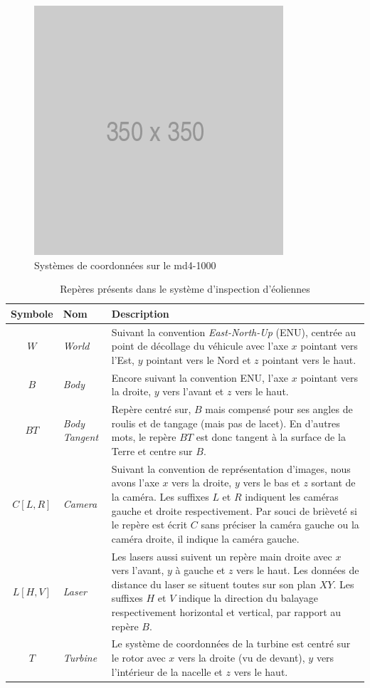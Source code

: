 \begin{figure}[htp]
  \centering
  \includegraphics[width=0.5\linewidth]{images/placeholder.png}
  \caption{Systèmes de coordonnées sur le md4-1000}
  \label{fig:md41000}
\end{figure}

\begin{table}[htp]
  \centering
  \setlength{\tabcolsep}{12pt}
  \begin{tabular}[htp]{|c|l|p{10cm}|}
    \hline
    Symbole & Nom                   & Description\\\hline
    $W$     &  \textit{World}       & Suivant la convention \textit{East-North-Up} (ENU), centrée au point de décollage du véhicule avec l'axe $x$ pointant vers l'Est, $y$ pointant vers le Nord et $z$ pointant vers le haut.\\ \hline
    $B$     &  \textit{Body}        & Encore suivant la convention ENU, l'axe $x$ pointant vers la droite, $y$ vers l'avant et $z$ vers le haut. \\ \hline
    $\mathit{BT}$  &  \textit{Body Tangent} & Repère centré sur, $B$ mais compensé pour ses angles de roulis et de tangage (mais pas de lacet). En d'autres mots, le repère ${BT}$ est donc tangent à la surface de la Terre et centre sur $B$. \\ \hline
    $\mathit{C[L,R]}$ & \textit{Camera} & Suivant la convention de représentation d'images, nous avons l'axe $x$ vers la droite, $y$ vers le bas et $z$ sortant de la caméra. Les suffixes $L$ et $R$ indiquent les caméras gauche et droite respectivement. Par souci de brièveté si le repère est écrit $C$ sans préciser la caméra gauche ou la caméra droite, il indique la caméra gauche.   \\ \hline
    $\mathit{L[H,V]}$ & \textit{Laser}& Les lasers aussi suivent un repère main droite avec $x$ vers l'avant, $y$ à gauche et $z$ vers le haut. Les données de distance du laser se situent toutes sur son plan $XY$. Les suffixes $H$ et $V$ indique la direction du balayage respectivement horizontal et vertical, par rapport au repère $B$. \\ \hline
    $\mathit{T}$ & \textit{Turbine} & Le système de coordonnées de la turbine est centré sur le rotor avec $x$ vers la droite (vu de devant), $y$ vers l'intérieur de la nacelle et $z$ vers le haut. \\ \hline
  \end{tabular}
  \setlength{\tabcolsep}{6pt}
  \caption{Repères présents dans le système d'inspection d'éoliennes}
  \label{table:coordinate_frames}
\end{table}

